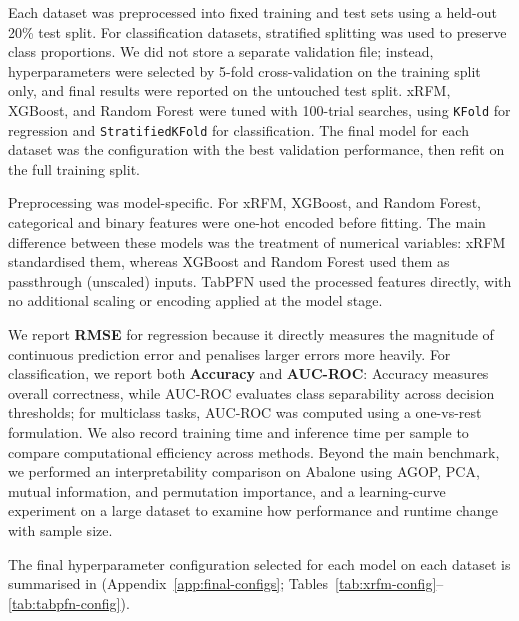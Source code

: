 Each dataset was preprocessed into fixed training and test sets using a held-out 20\% test split. For classification datasets, stratified splitting was used to preserve class proportions. We did not store a separate validation file; instead, hyperparameters were selected by 5-fold cross-validation on the training split only, and final results were reported on the untouched test split. xRFM, XGBoost, and Random Forest were tuned with 100-trial searches, using \texttt{KFold} for regression and \texttt{StratifiedKFold} for classification. The final model for each dataset was the configuration with the best validation performance, then refit on the full training split.

Preprocessing was model-specific. For xRFM, XGBoost, and Random Forest, categorical and binary features were one-hot encoded before fitting. The main difference between these models was the treatment of numerical variables: xRFM standardised them, whereas XGBoost and Random Forest used them as passthrough (unscaled) inputs. TabPFN used the processed features directly, with no additional scaling or encoding applied at the model stage.

We report \textbf{RMSE} for regression because it directly measures the magnitude of continuous prediction error and penalises larger errors more heavily. For classification, we report both \textbf{Accuracy} and \textbf{AUC-ROC}: Accuracy measures overall correctness, while AUC-ROC evaluates class separability across decision thresholds; for multiclass tasks, AUC-ROC was computed using a one-vs-rest formulation. We also record training time and inference time per sample to compare computational efficiency across methods. Beyond the main benchmark, we performed an interpretability comparison on Abalone using AGOP, PCA, mutual information, and permutation importance, and a learning-curve experiment on a large dataset to examine how performance and runtime change with sample size.

The final hyperparameter configuration selected for each model on each dataset is summarised in (Appendix~\ref*{app:final-configs}; Tables~\ref{tab:xrfm-config}--\ref{tab:tabpfn-config}).